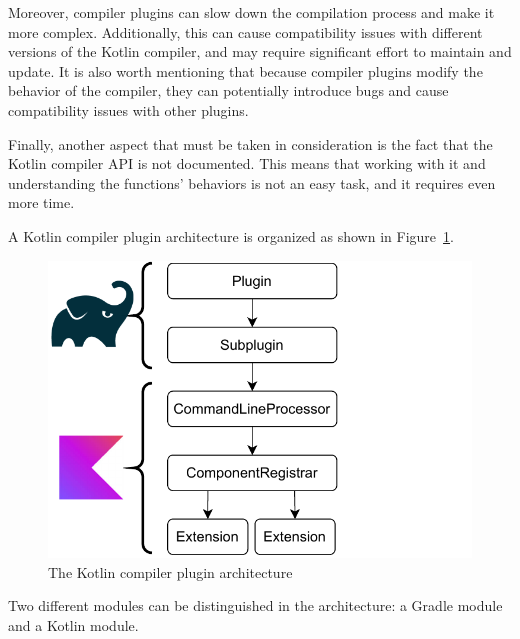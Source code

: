 Moreover, compiler plugins can slow down the compilation process and make it more complex. Additionally, this can cause compatibility issues with different versions of the Kotlin compiler, and may require significant effort to maintain and update. It is also worth mentioning that because compiler plugins modify the behavior of the compiler, they can potentially introduce bugs and cause compatibility issues with other plugins.

Finally, another aspect that must be taken in consideration is the fact that the Kotlin compiler API is not documented. This means that working with it and understanding the functions' behaviors is not an easy task, and it requires even more time.

A Kotlin compiler plugin architecture is organized as shown in Figure~\ref{fig:kotlin_compiler_plugin_architecture}.

\begin{figure}[!ht]
    \centering
    \includegraphics[scale=1]{document/chapters/2-metaprogramming/images/kotlin_compiler_plugin_architecture.pdf}
    \caption{The Kotlin compiler plugin architecture}
    \label{fig:kotlin_compiler_plugin_architecture}
\end{figure}

Two different modules can be distinguished in the architecture: a Gradle module and a Kotlin module.

